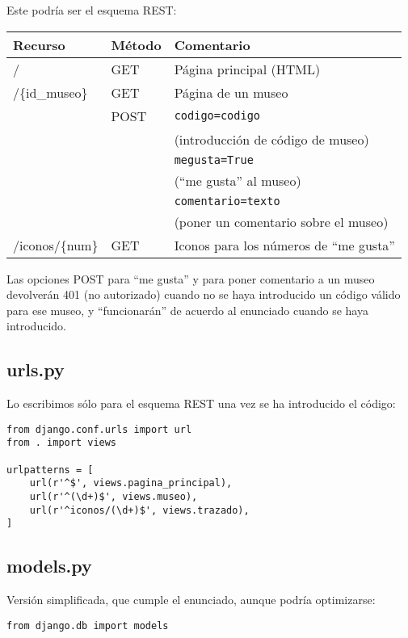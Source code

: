 {Este podría ser el esquema REST:

\begin{tabular}{|l|l|l|}
  \hline
  Recurso & Método & Comentario \\ \hline \hline
  /       & GET    & Página principal (HTML) \\ \hline
  /\{id\_museo\} & GET   & Página de un museo \\
          & POST   & \verb|codigo=codigo| \\
          &        & (introducción de código de museo) \\
          &        & \verb|megusta=True| \\
          &        & (``me gusta'' al museo) \\
          &        & \verb|comentario=texto| \\
          &        & (poner un comentario sobre el museo) \\ \hline
  /iconos/\{num\} & GET & Iconos para los números de ``me gusta'' \\ \hline
\end{tabular}

Las opciones POST para ``me gusta'' y para poner comentario a un museo devolverán 401 (no autorizado) cuando no se haya introducido un código válido para ese museo, y ``funcionarán'' de acuerdo al enunciado cuando se haya introducido.


\subsection*{urls.py}

Lo escribimos sólo para el esquema REST una vez se ha introducido el código:

\begin{verbatim}
from django.conf.urls import url
from . import views

urlpatterns = [
    url(r'^$', views.pagina_principal),
    url(r'^(\d+)$', views.museo),
    url(r'^iconos/(\d+)$', views.trazado),
]
\end{verbatim}

\subsection*{models.py}

Versión simplificada, que cumple el enunciado, aunque podría optimizarse:

\begin{verbatim}
from django.db import models


\end{verbatim}}
